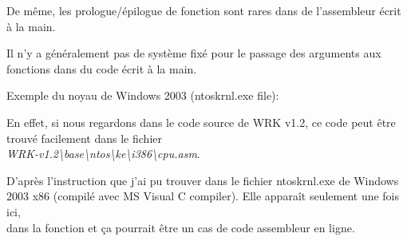 \par
De même, les prologue/épilogue de fonction sont rares dans de l'assembleur écrit
à la main.

\par
Il n'y a généralement pas de système fixé pour le passage des arguments aux fonctions
dans du code écrit à la main.

\par
Exemple du noyau de Windows 2003
(ntoskrnl.exe file):



En effet, si nous regardons dans le code source de \ac{WRK} v1.2, ce code peut être
trouvé facilement dans le fichier \\
\emph{WRK-v1.2\textbackslash{}base\textbackslash{}ntos\textbackslash{}ke\textbackslash{}i386\textbackslash{}cpu.asm}.

\par 
D'après l'instruction  que j'ai pu trouver dans le fichier ntoskrnl.exe de Windows
2003 x86 (compilé avec MS Visual C compiler).
Elle apparaît seulement une fois ici, \\
dans la fonction 
et ça pourrait être un cas de code assembleur en ligne.
